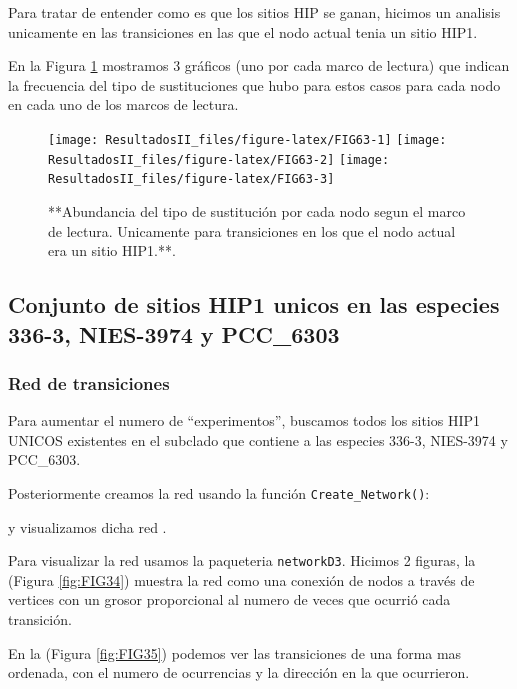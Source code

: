 \documentclass[
]{book}
\begin{document}
Para tratar de entender como es que los sitios HIP se ganan, hicimos un analisis unicamente en las transiciones en las que el nodo actual tenia un sitio HIP1.

En la Figura \ref{fig:FIG63} mostramos 3 gráficos (uno por cada marco de lectura) que indican la frecuencia del tipo de sustituciones que hubo para estos casos para cada nodo en cada uno de los marcos de lectura.

\begin{figure}

{\centering \texttt{[image: ResultadosII\_files/figure-latex/FIG63-1]} \texttt{[image: ResultadosII\_files/figure-latex/FIG63-2]} \texttt{[image: ResultadosII\_files/figure-latex/FIG63-3]} 

}

\caption{**Abundancia del tipo de sustitución por cada nodo segun el marco de lectura. Unicamente para transiciones en los que el nodo actual era un sitio HIP1.**.}\label{fig:FIG63}
\end{figure}

\hypertarget{conjunto-de-sitios-hip1-unicos-en-las-especies-336-3-nies-3974-y-pcc_6303}{%
\subsection{Conjunto de sitios HIP1 unicos en las especies 336-3, NIES-3974 y PCC\_6303}\label{conjunto-de-sitios-hip1-unicos-en-las-especies-336-3-nies-3974-y-pcc_6303}}

\hypertarget{red-de-transiciones-3}{%
\subsubsection{Red de transiciones}\label{red-de-transiciones-3}}

Para aumentar el numero de ``experimentos'', buscamos todos los sitios HIP1 UNICOS existentes en el subclado que contiene a las especies 336-3, NIES-3974 y PCC\_6303.

Posteriormente creamos la red usando la función \texttt{Create\_Network()}:

y visualizamos dicha red .

Para visualizar la red usamos la paqueteria \texttt{networkD3}. Hicimos 2 figuras, la (Figura \ref{fig:FIG34}) muestra la red como una conexión de nodos a través de vertices con un grosor proporcional al numero de veces que ocurrió cada transición.

En la (Figura \ref{fig:FIG35}) podemos ver las transiciones de una forma mas ordenada, con el numero de ocurrencias y la dirección en la que ocurrieron.
\end{document}
